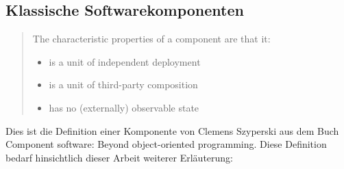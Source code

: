 \subsection{Klassische Softwarekomponenten}
\label{sec:2_Softwarekomponente_Klassisch}
\begin{quote}
\glqq The characteristic properties of a component are that it:\grqq
\begin{itemize}
\item is a unit of independent deployment
\item is a unit of third-party composition
\item has no (externally) observable state
\end{itemize}
\end{quote}

Dies ist die Definition einer Komponente von Clemens Szyperski aus dem Buch \glqq Component software: Beyond object-oriented programming\grqq \citereset \autocite[siehe][S. 35-38]{Szyperski.2002}.
Diese Definition bedarf hinsichtlich dieser Arbeit weiterer Erläuterung:
